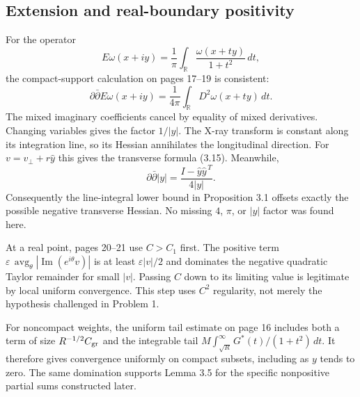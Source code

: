 \documentclass[10pt]{article}
\begin{document}
\subsection*{Extension and real-boundary positivity}
For the operator \[E\omega(x+iy)=\frac1\pi\int_\mathbb R\frac{\omega(x+ty)}{1+t^2}\,dt,\] the compact-support calculation on pages 17–19 is consistent: \[\partial\bar\partial E\omega(x+iy)
 =\frac1{4\pi}\int_\mathbb RD^2\omega(x+ty)\,dt.\] The mixed imaginary coefficients cancel by equality of mixed derivatives. Changing variables gives the factor \(1/|y|\). The X-ray transform is constant along its integration line, so its Hessian annihilates the longitudinal direction. For \(v=v_\perp+r\widehat y\) this gives the transverse formula (3.15). Meanwhile, \[\partial\bar\partial|y|=\frac{I-\widehat y\widehat y^{\,T}}{4|y|}.\] Consequently the line-integral lower bound in Proposition 3.1 offsets exactly the possible negative transverse Hessian. No missing \(4\), \(\pi\), or \(|y|\) factor was found here.\par
At a real point, pages 20–21 use \(C>C_1\) first. The positive term \(\varepsilon\,\operatorname{avg}_\theta|\operatorname{Im}(e^{i\theta}v)|\) is at least \(\varepsilon|v|/2\) and dominates the negative quadratic Taylor remainder for small \(|v|\). Passing \(C\) down to its limiting value is legitimate by local uniform convergence. This step uses \(C^2\) regularity, not merely the hypothesis challenged in Problem 1.\par
For noncompact weights, the uniform tail estimate on page 16 includes both a term of size \(R^{-1/2}C_{\rm gr}\) and the integrable tail \(M\int_{\sqrt R}^{\infty}G^*(t)/(1+t^2)\,dt\). It therefore gives convergence uniformly on compact subsets, including as \(y\) tends to zero. The same domination supports Lemma 3.5 for the specific nonpositive partial sums constructed later.\par
\end{document}
